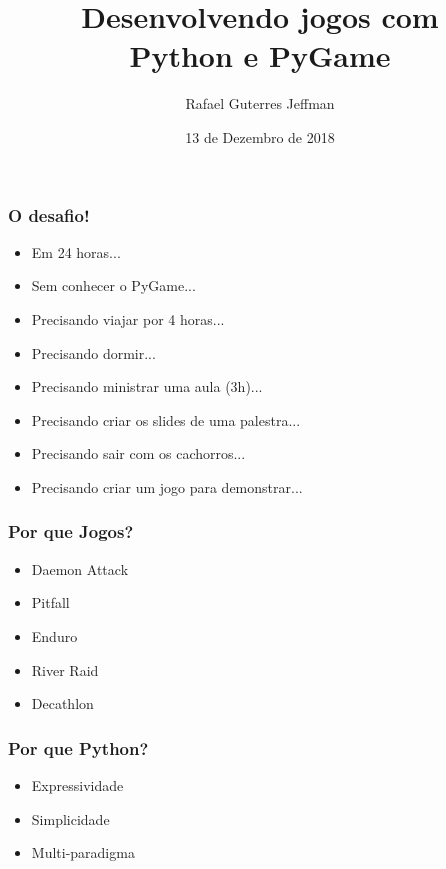 


\title{Desenvolvendo jogos com\\Python e PyGame}
\subtitle{}
\author{Rafael Guterres Jeffman}
\institute{}
\date{13 de Dezembro de 2018}



\coverframe


\begin{frame}
    \frametitle{O desafio!}

    \begin{itemize}
        \item Em 24 horas...
        \item Sem conhecer o PyGame...
        \item Precisando viajar por 4 horas...
        \item Precisando dormir...
        \item Precisando ministrar uma aula (3h)...
        \item Precisando criar os slides de uma palestra...
        \item Precisando sair com os cachorros...
        \item Precisando criar um jogo para demonstrar...
    \end{itemize}
\end{frame}


\begin{frame}
    \frametitle{Por que Jogos?}

    \begin{itemize}
        \item Daemon Attack
        \item Pitfall
        \item Enduro
        \item River Raid
        \item Decathlon
    \end{itemize}
\end{frame}

\begin{frame}
    \frametitle{Por que Python?}

    \begin{itemize}
        \item Expressividade
        \item Simplicidade
        \item Multi-paradigma
    \end{itemize}
\end{frame}

